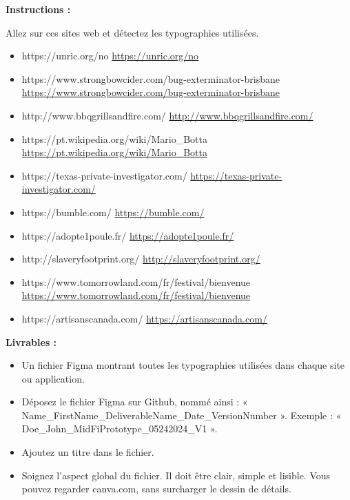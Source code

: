 \makeheaderfiles

\textbf{Instructions :}

Allez sur ces sites web et détectez les typographies utilisées.

\begin{itemize}
\item https://unric.org/no \url{https://unric.org/no}
\item https://www.strongbowcider.com/bug-exterminator-brisbane \url{https://www.strongbowcider.com/bug-exterminator-brisbane}
\item http://www.bbqgrillsandfire.com/ \url{http://www.bbqgrillsandfire.com/}
\item https://pt.wikipedia.org/wiki/Mario\_Botta \url{https://pt.wikipedia.org/wiki/Mario_Botta}
\item https://texas-private-investigator.com/ \url{https://texas-private-investigator.com/}
\item https://bumble.com/ \url{https://bumble.com/}
\item https://adopte1poule.fr/ \url{https://adopte1poule.fr/}
\item http://slaveryfootprint.org/ \url{http://slaveryfootprint.org/}
\item https://www.tomorrowland.com/fr/festival/bienvenue \url{https://www.tomorrowland.com/fr/festival/bienvenue}
\item https://artisanscanada.com/ \url{https://artisanscanada.com/}
\end{itemize}

\textbf{Livrables :}

\begin{itemize}
\item Un fichier Figma montrant toutes les typographies utilisées dans chaque site ou application.
\item Déposez le fichier Figma sur Github, nommé ainsi : « Name\_FirstName\_DeliverableName\_Date\_VersionNumber ». Exemple : « Doe\_John\_MidFiPrototype\_05242024\_V1 ».
\item Ajoutez un titre dans le fichier.
\item Soignez l'aspect global du fichier. Il doit être clair, simple et lisible. Vous pouvez regarder canva.com, sans surcharger le dessin de détails.
\end{itemize}

